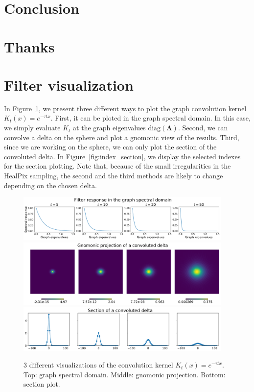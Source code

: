 \documentclass[preprint,12pt,authoryear]{elsarticle}
\newcommand{\assign}[1]{{\color[rgb]{.8,.5,.8}{Assigned: #1 }}}
\renewcommand{\b}[1]{{\bm{#1}}}   %
\newcommand{\1}{\b{1}}              %
\newcommand{\0}{\b{0}}              %
\newcommand{\bLambda}{\b{\Lambda}}
\begin{document}
\section{Conclusion}
\assign{Nathanaël, Tomek, Michaël}

\section*{Thanks}

\appendix

\section{Filter visualization}
\label{app:filter_visualization}

In Figure~\ref{fig:gaussian_filters_visualization}, we present three different
ways to plot the graph convolution kernel $K_t(x)=e^{-\tau t x}$.  First, it can
be ploted in the graph spectral domain. In this case, we simply evaluate $K_t$
at the graph eigenvalues $\text{diag}(\bLambda)$. Second, we can convolve a
delta on the sphere and plot a gnomonic view of the results. Third, since we are
working on the sphere, we can only plot the section of the convoluted delta. In
Figure~\ref{fig:index_section}, we display the selected indexes for the section
plotting. Note that, because of the small irregularities in the HealPix
sampling, the second and the third methods are likely to change depending on the
chosen delta.

\begin{figure}[!ht]
\centering
\includegraphics[width=0.95\textwidth]{figures/gaussian_filters_spectral.pdf}
\includegraphics[width=0.95\textwidth]{figures/gaussian_filters_gnomonic.pdf}
\includegraphics[width=0.95\textwidth]{figures/gaussian_filters_section.pdf}
\caption{3 different visualizations of the convolution kernel $K_t(x)=e^{-\tau t x}$.  
Top: graph spectral domain. 
Middle: gnomonic projection.
Bottom: section plot.}
\label{fig:gaussian_filters_visualization}
\end{figure}
\end{document}
